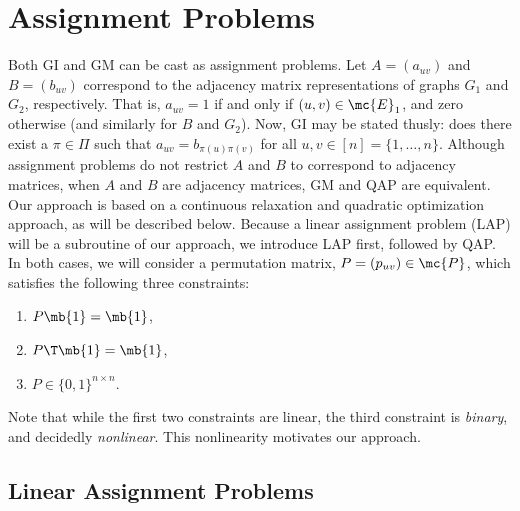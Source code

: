 \documentclass[10pt,journal,cspaper,compsoc]{IEEEtran}
\begin{document}
\section{Assignment Problems} %
\label{sub:assignment_problems}

Both GI and GM can be cast as assignment problems.  Let $A=(a_{uv})$ and $B=(b_{uv})$ correspond to the adjacency matrix representations of graphs $G_1$ and $G_2$, respectively.  That is, $a_{uv}=1$ if and only if $(u,v) \in \mc{E}_1$, and zero otherwise (and similarly for $B$ and $G_2$). Now, GI may be stated thusly:  does there exist a $\pi \in \Pi$ such that $a_{uv}=b_{\pi(u)\pi(v)}$ for all $u,v \in [n]=\{1,\ldots, n\}$.  Although assignment problems do not restrict $A$ and $B$ to correspond to adjacency matrices, when $A$ and $B$ are adjacency matrices, GM and QAP are equivalent.  Our approach is based on a continuous relaxation and quadratic optimization approach, as will be described below.  Because a linear assignment problem (LAP) will be a subroutine of our approach, we introduce LAP first, followed by QAP.  In both cases, we will consider a permutation matrix, $P=(p_{uv}) \in \mc{P}$, which satisfies the following three constraints:
\begin{enumerate}
\item	$P\mb{1} = \mb{1}$,
\item	$P\T \mb{1}=\mb{1}$, %
\item 	$P \in  \{0,1\}^{n \times n}$.	
\end{enumerate}
Note that while the first two constraints are linear, the third constraint is \emph{binary}, and decidedly \emph{nonlinear}.  This nonlinearity motivates our approach.






\subsection{Linear Assignment Problems} %
\label{ssub:linear_assignment_problems}
\end{document}
